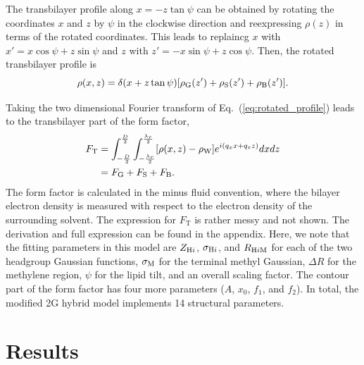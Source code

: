 The transbilayer profile along $x=-z\tan\psi$ can be obtained by rotating
the coordinates $x$ and $z$ by $\psi$ in the clockwise direction and
reexpressing $\rho(z)$ in terms of the rotated coordinates. This leads
to replaincg $x$ with $x'=x\cos\psi+z\sin\psi$ and
$z$ with $z'=-x\sin\psi+z\cos\psi$. Then, the rotated transbilayer profile is
\begin{equation}
  \rho(x,z) = \delta(x+z\tan\psi)\mathopen{}\left[ \rho_\mathrm{G}(z') + \rho_\mathrm{S}(z') + \rho_\mathrm{B}(z') \right]\mathclose{}.
  \label{eq:rotated_profile}
\end{equation}

Taking the two dimensional Fourier transform of Eq.~(\ref{eq:rotated_profile})
leads to the transbilayer part of the form factor,
\begin{align}
  F_\mathrm{T} 
  &= \int_{-\frac{D}{2}}^{\frac{D}{2}} \int_{-\frac{\lambda_r}{2}}^{\frac{\lambda_r}{2}} 
     \mathopen{}\left[ \rho(x,z)-\rho_\mathrm{W} \right]\mathclose{} e^{i(q_xx+q_zz)} dxdz \\
  &= F_\mathrm{G} + F_\mathrm{S} + F_\mathrm{B}.
\end{align}
The form factor is calculated in the minus fluid convention, 
where the bilayer electron density
is measured with respect to the electron density of the surrounding solvent.
The expression for $F_\mathrm{T}$ is rather messy and not shown. 
The derivation and full expression can be found in the appendix. Here, 
we note that
the fitting parameters in this model are $Z_{\mathrm{H}i}$, $\sigma_{\mathrm{H}i}$, and 
$R_{\mathrm{H}i\mathrm{M}}$ for each of the two headgroup Gaussian functions, $\sigma_\mathrm{M}$ for
the terminal methyl Gaussian, $\Delta R$ for the methylene region, $\psi$ for
the lipid tilt, and an overall scaling factor. The contour part of the 
form factor has four more parameters ($A$, $x_0$, $f_1$, and $f_2$).
In total, the modified 2G hybrid model implements 14 structural parameters.


\section{Results}
